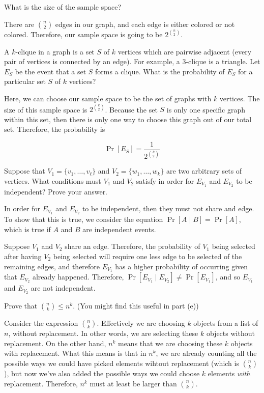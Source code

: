 \documentclass[11pt]{article}
\begin{document}
\begin{Parts}
\Part What is the size of the sample space?

\begin{solution}
    There are ${n \choose 2}$ edges in our graph, and each edge is either colored or not colored. Therefore, our sample space is going to be $2^{n \choose 2}$.
\end{solution}

\Part A $k$-clique in a graph is a set $S$ of $k$ vertices which are pairwise adjacent (every pair of vertices is connected by an edge). For example, a $3$-clique is a triangle. Let $E_S$ be the event that a set $S$ forms a clique. What is the probability of $E_S$ for a particular set $S$ of $k$ vertices? 

\begin{solution}
    Here, we can choose our sample space to be the set of graphs with $k$ vertices. The size of this sample space is $2^{k \choose 2}$. Because the set $S$ is only one specific graph within this set, then there is only one way to choose this graph out of our total set. Therefore, the probability is 

    \[ \Pr[E_S] = \frac{1}{2^{k \choose 2}}\]
\end{solution}

\Part Suppose that $V_1 = \{v_1, \dots, v_{\ell}\}$ and $V_2 = \{w_1, \dots, w_k\}$ are two arbitrary sets of vertices. What conditions must $V_1$ and $V_2$ satisfy in order for $E_{V_1}$ and $E_{V_2}$ to be independent? Prove your answer.

\begin{solution}
    In order for $E_{V_1}$ and $E_{V_2}$ to be independent, then they must not share and edge. To show that this is true, we consider the equation $\Pr[A \mid B] = \Pr[A]$, which is true if $A$ and $B$ are independent events. 

    Suppose $V_1$ and $V_2$ share an edge. Therefore, the probability of $V_1$ being selected after having $V_2$ being selected will require one less edge to be selected of the remaining edges, and therefore $E_{V_1}$ has a higher probability of occurring given that $E_{V_2}$ already happened. Therefore, $\Pr[E_{V_1} \mid E_{V_2}] \neq \Pr[E_{V_1}]$, and so $E_{V_1}$ and $E_{V_2}$ are not independent.
\end{solution}

\Part Prove that ${n \choose k} \le n^k$. (You might find this useful in part (e))


\begin{solution}
    Consider the expression $n \choose k$. Effectively we are choosing $k$ objects from a list of $n$, without replacement. In other words, we are selecting these $k$ objects without replacement. On the other hand, $n^k$ means that we are choosing these $k$ objects with replacement. What this means is that in $n^k$, we are already counting all the possible ways we could have picked elements wihtout replacement (which is $n \choose k$), but now we've also added the possible ways we could choose $k$ elements \textit{with} replacement. Therefore, $n^k$ must at least be larger than $n \choose k$.
\end{solution}


\end{Parts}
\end{document}

